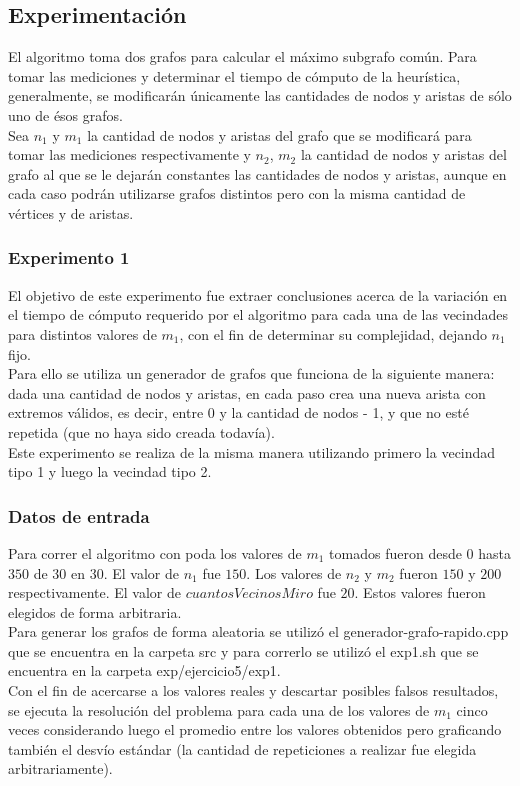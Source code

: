 \subsection{Experimentación}
\noindent El algoritmo toma dos grafos para calcular el máximo subgrafo común. Para tomar las mediciones y determinar el tiempo de cómputo de la heurística, generalmente, se modificarán únicamente las cantidades de nodos y aristas de sólo uno de ésos grafos. \\
Sea $n_1$ y $m_1$ la cantidad de nodos y aristas del grafo que se modificará para tomar las mediciones respectivamente y $n_2$, $m_2$ la cantidad de nodos y aristas del grafo al que se le dejarán constantes las cantidades de nodos y aristas, aunque en cada caso podrán utilizarse grafos distintos pero con la misma cantidad de vértices y de aristas.
    
\subsubsection*{Experimento 1}\;
\noindent El objetivo de este experimento fue extraer conclusiones acerca de la variación en el tiempo de cómputo requerido por el algoritmo para cada una de las vecindades para distintos valores de $m_1$, con el fin de determinar su complejidad, dejando $n_1$ fijo. \\
   Para ello se utiliza un generador de grafos que funciona de la siguiente manera: dada una cantidad de nodos y aristas, en cada paso crea una nueva arista con extremos válidos, es decir, entre 0 y la cantidad de nodos - 1, y que no esté repetida (que no haya sido creada todavía).\\
   Este experimento se realiza de la misma manera utilizando primero la vecindad tipo 1 y luego la vecindad tipo 2.
     	
\subsubsection*{Datos de entrada}\;
 \noindent Para correr el algoritmo con poda los valores de $m_1$ tomados fueron desde $0$ hasta $350$ de $30$ en $30$. El valor de $n_1$ fue $150$. Los valores de $n_2$ y $m_2$ fueron $150$ y $200$ respectivamente. El valor de $cuantosVecinosMiro$ fue $20$. Estos valores fueron elegidos de forma arbitraria.\\
        Para generar los grafos de forma aleatoria se utilizó el generador-grafo-rapido.cpp que se encuentra en la carpeta src y para correrlo se utilizó el exp1.sh que se encuentra en la carpeta exp/ejercicio5/exp1. \\
        Con el fin de acercarse a los valores reales y descartar posibles falsos resultados, se ejecuta la resolución del problema para cada una de los valores de $m_1$ cinco veces considerando luego el promedio entre los valores obtenidos pero graficando también el desvío estándar (la cantidad de repeticiones a realizar fue elegida arbitrariamente).\; 
     	

